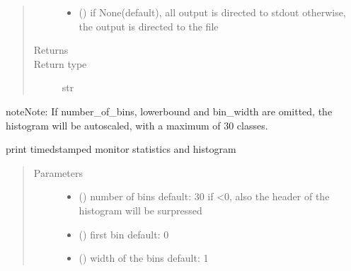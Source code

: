 \documentclass[letterpaper,10pt,english]{sphinxmanual}
\begin{document}
\begin{fulllineitems}
\begin{fulllineitems}
\begin{quote}
\begin{description}
\begin{itemize}
\item {} 
 () \textendash{} if None(default), all output is directed to stdout 
otherwise, the output is directed to the file

\end{itemize}

\item[{Returns}] \leavevmode
{}

\item[{Return type}] \leavevmode
str

\end{description}\end{quote}

\begin{sphinxadmonition}{note}{Note:}
If number\_of\_bins, lowerbound and bin\_width are omitted, the histogram will be autoscaled,
with a maximum of 30 classes.
\end{sphinxadmonition}

\end{fulllineitems}


\begin{fulllineitems}
\label{\detokenize{Reference:salabim.MonitorTimestamp.print_histograms}}
print timedstamped monitor statistics and histogram
\begin{quote}\begin{description}
\item[{Parameters}] \leavevmode\begin{itemize}
\item {} 
 () \textendash{} number of bins 
default: 30 
if \textless{}0, also the header of the histogram will be surpressed

\item {} 
 () \textendash{} first bin 
default: 0

\item {} 
 () \textendash{} width of the bins 
default: 1


\end{itemize}
\end{description}
\end{quote}
\end{fulllineitems}
\end{fulllineitems}
\end{document}
